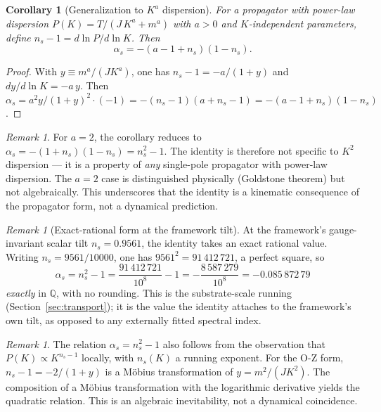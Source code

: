 \documentclass[12pt]{article}
\newtheorem{corollary}[theorem]{Corollary}
\theoremstyle{definition}
\theoremstyle{remark}
\newtheorem{remark}[theorem]{Remark}
\begin{document}
\begin{corollary}[Generalization to $K^a$ dispersion]\label{cor:Ka}
For a propagator with power-law dispersion $P(K) = T/(J\,K^a + m^a)$ with $a > 0$ and $K$-independent parameters, define $n_s - 1 = d\ln P/d\ln K$. Then
\begin{equation}\label{eq:Ka-identity}
  \alpha_s = -(a - 1 + n_s)(1 - n_s).
\end{equation}
\end{corollary}

\begin{proof}
With $y \equiv m^a/(JK^a)$, one has $n_s - 1 = -a/(1+y)$ and $dy/d\ln K = -a\,y$. Then $\alpha_s = a^2 y/(1+y)^2 \cdot (-1) = -(n_s - 1)(a + n_s - 1) = -(a - 1 + n_s)(1 - n_s)$.
\end{proof}

\begin{remark}
For $a = 2$, the corollary reduces to $\alpha_s = -(1 + n_s)(1 - n_s) = n_s^2 - 1$. The identity is therefore not specific to $K^2$ dispersion --- it is a property of \emph{any} single-pole propagator with power-law dispersion. The $a = 2$ case is distinguished physically (Goldstone theorem) but not algebraically. This underscores that the identity is a kinematic consequence of the propagator form, not a dynamical prediction.
\end{remark}

\begin{remark}[Exact-rational form at the framework tilt]\label{rem:exact-Q}
At the framework's gauge-invariant scalar tilt $n_s = 0.9561$, the identity takes an exact rational value. Writing $n_s = 9561/10000$, one has $9561^2 = 91\,412\,721$, a perfect square, so
\begin{equation}\label{eq:exact-Q}
  \alpha_s = n_s^2 - 1 = \frac{91\,412\,721}{10^8} - 1 = -\frac{8\,587\,279}{10^8} = -0.085\,872\,79
\end{equation}
\emph{exactly} in $\mathbb{Q}$, with no rounding. This is the substrate-scale running (Section~\ref{sec:transport}); it is the value the identity attaches to the framework's own tilt, as opposed to any externally fitted spectral index.
\end{remark}

\begin{remark}
The relation $\alpha_s = n_s^2 - 1$ also follows from the observation that $P(K) \propto K^{n_s - 1}$ locally, with $n_s(K)$ a running exponent. For the O-Z form, $n_s - 1 = -2/(1+y)$ is a M\"obius transformation of $y = m^2/(JK^2)$. The composition of a M\"obius transformation with the logarithmic derivative yields the quadratic relation. This is an algebraic inevitability, not a dynamical coincidence.
\end{remark}
\end{document}
